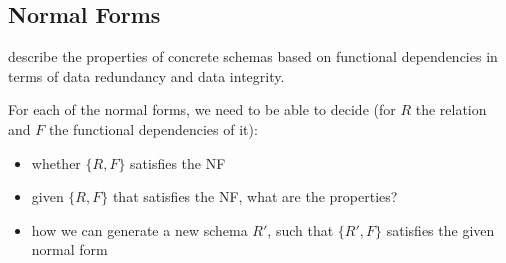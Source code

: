 \newpage
\subsection{Normal Forms}
\label{sec:normal-forms}
 describe the properties of concrete schemas based on functional dependencies in terms of data redundancy and data integrity.

For each of the normal forms, we need to be able to decide (for $R$ the relation and $F$ the functional dependencies of it):
\begin{itemize}
    \item whether $\{ R, F \}$ satisfies the NF
    \item given $\{ R, F \}$ that satisfies the NF, what are the properties?
    \item how we can generate a new schema $R'$, such that $\{ R', F \}$ satisfies the given normal form
\end{itemize}
